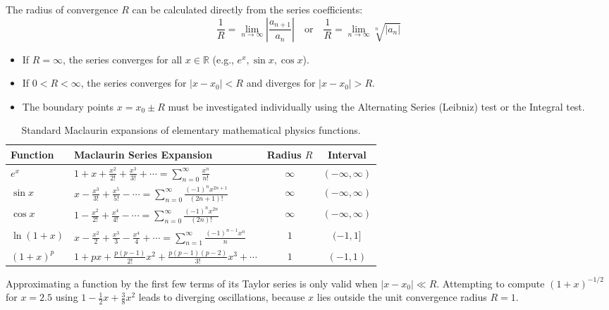 \begin{mathdefinition}
The radius of convergence $R$ can be calculated directly from the series coefficients:
\begin{equation}
\frac{1}{R} = \lim_{n \to \infty} \left|\frac{a_{n+1}}{a_n}\right| \quad \text{or} \quad \frac{1}{R} = \lim_{n \to \infty} \sqrt[n]{|a_n|}
\end{equation}
\begin{itemize}
    \item If $R = \infty$, the series converges for all $x \in \mathbb{R}$ (e.g., $e^x, \sin x, \cos x$).
    \item If $0 < R < \infty$, the series converges for $|x - x_0| < R$ and diverges for $|x - x_0| > R$.
    \item The boundary points $x = x_0 \pm R$ must be investigated individually using the Alternating Series (Leibniz) test or the Integral test.
\end{itemize}
\end{mathdefinition}

\begin{table}[H]
\centering
\small
\begin{tabularx}{\textwidth}{llcc}
\toprule
\textbf{Function} & \textbf{Maclaurin Series Expansion} & \textbf{Radius $R$} & \textbf{Interval} \\
\midrule
$e^x$ & $1 + x + \frac{x^2}{2!} + \frac{x^3}{3!} + \cdots = \sum_{n=0}^\infty \frac{x^n}{n!}$ & $\infty$ & $(-\infty, \infty)$ \\
$\sin x$ & $x - \frac{x^3}{3!} + \frac{x^5}{5!} - \cdots = \sum_{n=0}^\infty \frac{(-1)^n x^{2n+1}}{(2n+1)!}$ & $\infty$ & $(-\infty, \infty)$ \\
$\cos x$ & $1 - \frac{x^2}{2!} + \frac{x^4}{4!} - \cdots = \sum_{n=0}^\infty \frac{(-1)^n x^{2n}}{(2n)!}$ & $\infty$ & $(-\infty, \infty)$ \\
$\ln(1+x)$ & $x - \frac{x^2}{2} + \frac{x^3}{3} - \frac{x^4}{4} + \cdots = \sum_{n=1}^\infty \frac{(-1)^{n-1} x^n}{n}$ & $1$ & $(-1, 1]$ \\
$(1+x)^p$ & $1 + px + \frac{p(p-1)}{2!}x^2 + \frac{p(p-1)(p-2)}{3!}x^3 + \cdots$ & $1$ & $(-1, 1)$ \\
\bottomrule
\end{tabularx}
\caption{Standard Maclaurin expansions of elementary mathematical physics functions.}
\label{tab:ch03_expansions}
\end{table}

\begin{pitfallbox}
Approximating a function by the first few terms of its Taylor series is only valid when $|x - x_0| \ll R$. Attempting to compute $(1+x)^{-1/2}$ for $x = 2.5$ using $1 - \frac{1}{2}x + \frac{3}{8}x^2$ leads to diverging oscillations, because $x$ lies outside the unit convergence radius $R = 1$.
\end{pitfallbox}

